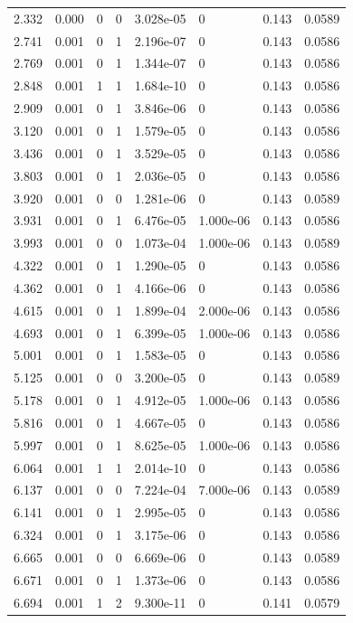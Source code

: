 \documentclass[preview]{standalone}
\begin{document}
{{\begin{tabular}{L{1.2cm}C{1.2cm} C{0.3cm}C{0.5cm} C{1.4cm}C{1.4cm} C{1.4cm}C{1.4cm}}
  2.332  &  0.000  & 0     &  0 &  3.028e-05  & 0  & 0.143 &  0.0589   \\ 
  2.741  &  0.001  & 0     &  1 &  2.196e-07  & 0  & 0.143 &  0.0586   \\ 
  2.769  &  0.001  & 0     &  1 &  1.344e-07  & 0  & 0.143 &  0.0586   \\ 
  2.848  &  0.001  & 1     &  1 &  1.684e-10  & 0  & 0.143 &  0.0586   \\ 
  2.909  &  0.001  & 0     &  1 &  3.846e-06  & 0  & 0.143 &  0.0586   \\ 
  3.120  &  0.001  & 0     &  1 &  1.579e-05  & 0  & 0.143 &  0.0586   \\ 
  3.436  &  0.001  & 0     &  1 &  3.529e-05  & 0  & 0.143 &  0.0586   \\ 
  3.803  &  0.001  & 0     &  1 &  2.036e-05  & 0  & 0.143 &  0.0586   \\ 
  3.920  &  0.001  & 0     &  0 &  1.281e-06  & 0  & 0.143 &  0.0589   \\ 
  3.931  &  0.001  & 0     &  1 &  6.476e-05  & 1.000e-06  & 0.143 &  0.0586   \\ 
  3.993  &  0.001  & 0     &  0 &  1.073e-04  & 1.000e-06  & 0.143 &  0.0589   \\ 
  4.322  &  0.001  & 0     &  1 &  1.290e-05  & 0  & 0.143 &  0.0586   \\ 
  4.362  &  0.001  & 0     &  1 &  4.166e-06  & 0  & 0.143 &  0.0586   \\ 
  4.615  &  0.001  & 0     &  1 &  1.899e-04  & 2.000e-06  & 0.143 &  0.0586   \\ 
  4.693  &  0.001  & 0     &  1 &  6.399e-05  & 1.000e-06  & 0.143 &  0.0586   \\ 
  5.001  &  0.001  & 0     &  1 &  1.583e-05  & 0  & 0.143 &  0.0586   \\ 
  5.125  &  0.001  & 0     &  0 &  3.200e-05  & 0  & 0.143 &  0.0589   \\ 
  5.178  &  0.001  & 0     &  1 &  4.912e-05  & 1.000e-06  & 0.143 &  0.0586   \\ 
  5.816  &  0.001  & 0     &  1 &  4.667e-05  & 0  & 0.143 &  0.0586   \\ 
  5.997  &  0.001  & 0     &  1 &  8.625e-05  & 1.000e-06  & 0.143 &  0.0586   \\ 
  6.064  &  0.001  & 1     &  1 &  2.014e-10  & 0  & 0.143 &  0.0586   \\ 
  6.137  &  0.001  & 0     &  0 &  7.224e-04  & 7.000e-06  & 0.143 &  0.0589   \\ 
  6.141  &  0.001  & 0     &  1 &  2.995e-05  & 0  & 0.143 &  0.0586   \\ 
  6.324  &  0.001  & 0     &  1 &  3.175e-06  & 0  & 0.143 &  0.0586   \\ 
  6.665  &  0.001  & 0     &  0 &  6.669e-06  & 0  & 0.143 &  0.0589   \\ 
  6.671  &  0.001  & 0     &  1 &  1.373e-06  & 0  & 0.143 &  0.0586   \\ 
  6.694  &  0.001  & 1     &  2 &  9.300e-11  & 0  & 0.141 &  0.0579   \\ 
\hline 
\end{tabular} 

}}
\end{document}
